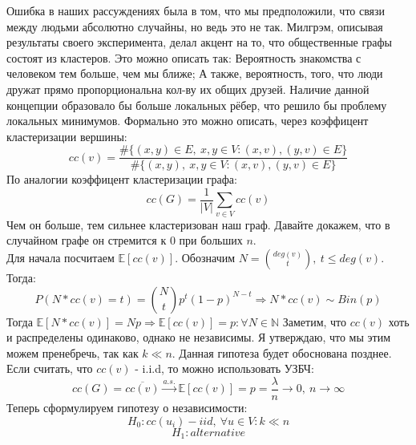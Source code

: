 Ошибка в наших рассуждениях была в том, что мы предположили, что связи между людьми абсолютно
случайны, но ведь это не так. Милгрэм, описывая результаты своего эксперимента, делал акцент
на то, что общественные графы состоят из кластеров. Это можно описать так: Вероятность знакомства
с человеком тем больше, чем мы ближе; А также, вероятность, того, что люди дружат прямо пропорциональна
кол-ву их общих друзей. Наличие данной концепции образовало бы больше локальных рёбер, что решило бы
проблему локальных минимумов. Формально это можно описать, через коэффицент кластеризации вершины:
\begin{equation*}
    cc(v) = \frac{\#\{(x, y) \in E, \ x, y \in V: (x, v), (y, v) \in E\}}
    {\#\{(x, y), \ x, y \in V: (x, v), (y, v) \in E\}}
\end{equation*}
По аналогии коэффицент кластеризации графа:
\begin{equation*}
    cc(G) = \frac{1}{|V|}\sum_{v \in V}cc(v)
\end{equation*}
Чем он больше, тем сильнее кластеризован наш граф. Давайте докажем, что в случайном графе
он стремится к 0 при больших $n$. \\
Для начала посчитаем $\mathbb{E}[cc(v)]$. Обозначим $N = \binom{deg(v)}{t}, \ t \leq deg(v)$.
Тогда:
\begin{equation*}
    P(N * cc(v) = t) = \binom{N}{t}p^t(1 - p)^{N - t} \Rightarrow N * cc(v) \sim Bin(p) 
\end{equation*}
Тогда $\mathbb{E}[N * cc(v)] = Np \Rightarrow \mathbb{E}[cc(v)] = p : \forall N \in \mathbb{N}$
Заметим, что $cc(v)$  хоть и распределены одинаково, однако не независимы. Я утверждаю, что мы
этим можем пренебречь, так как $k \ll n$. Данная гипотеза будет обоснована позднее. \\
Если считать, что $cc(v)$ - i.i.d, то можно использовать УЗБЧ:
\begin{equation*}
    cc(G) = \overline{cc(v)} \overset{a.s.}{\rightarrow} 
    \mathbb{E}[cc(v)] = p = \frac{\lambda}{n} \rightarrow 0, \ n \rightarrow \infty
\end{equation*}
Теперь сформулируем гипотезу о независимости:
\begin{equation*}
    H_0: cc(u_i) - iid, \ \forall u \in V : k \ll n
\end{equation*}
\begin{equation*}
    H_1: alternative 
\end{equation*}


